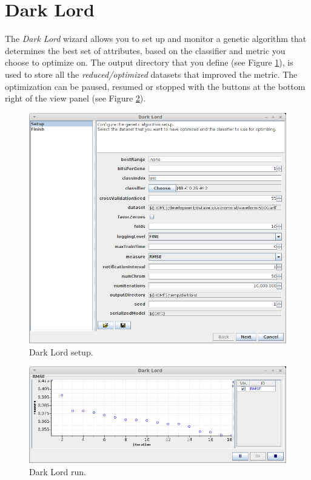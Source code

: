 \section{Dark Lord}
The \textit{Dark Lord} wizard allows you to set up and monitor a genetic
algorithm that determines the best set of attributes, based on the classifier
and metric you choose to optimize on. The output directory that you define
(see Figure \ref{darklord_setup}), is used to store all the \textit{reduced/optimized}
datasets that improved the metric. The optimization can be paused, resumed or
stopped with the buttons at the bottom right of the view panel (see Figure
\ref{darklord_run}).

\begin{figure}[htb]
  \centering
  \includegraphics[width=12.0cm]{images/darklord_setup.png}
  \caption{Dark Lord setup.}
  \label{darklord_setup}
\end{figure}

\begin{figure}[htb]
  \centering
  \includegraphics[width=12.0cm]{images/darklord_run.png}
  \caption{Dark Lord run.}
  \label{darklord_run}
\end{figure}

